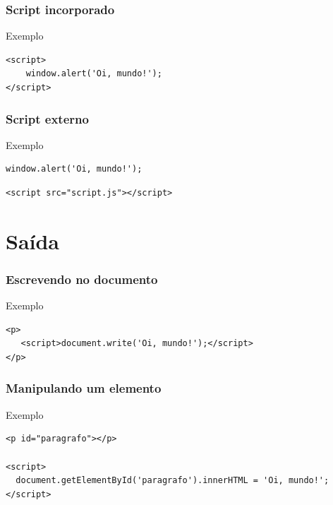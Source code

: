 \documentclass[aspectratio=169]{beamer} %
\begin{document}
\begin{frame}[fragile]
	\frametitle{Script incorporado}
	
	\begin{exampleblock}{Exemplo}
		\begin{lstlisting}
<script>
	window.alert('Oi, mundo!');
</script>
		\end{lstlisting}
	\end{exampleblock}
\end{frame}

\begin{frame}[fragile]
	\frametitle{Script externo}
	
	\begin{exampleblock}{Exemplo}
		\begin{lstlisting}
window.alert('Oi, mundo!');			
		\end{lstlisting}
		
		\begin{lstlisting}
<script src="script.js"></script>
		\end{lstlisting}
	\end{exampleblock}
\end{frame}

\section{Saída}

\begin{frame}[fragile]
	\frametitle{Escrevendo no documento}
	
	\begin{exampleblock}{Exemplo}
		\begin{lstlisting}
<p>
   <script>document.write('Oi, mundo!');</script>
</p>
		\end{lstlisting}
	\end{exampleblock}
\end{frame}

\begin{frame}[fragile]
	\frametitle{Manipulando um elemento}
	
	\begin{exampleblock}{Exemplo}
		\begin{lstlisting}
<p id="paragrafo"></p>

<script>
  document.getElementById('paragrafo').innerHTML = 'Oi, mundo!';
</script>
		\end{lstlisting}
	\end{exampleblock}
\end{frame}
\end{document}
